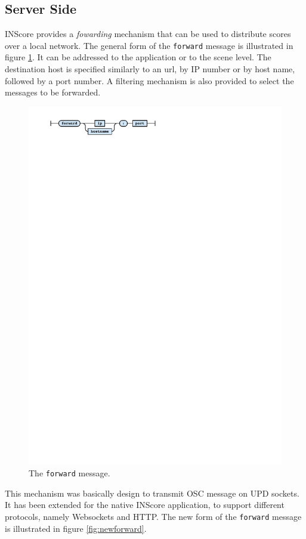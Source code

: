 \documentclass{article}
\newcommand{\icode}[1]	{{\small \texttt{#1}}}
\begin{document}
\subsection{Server Side}\label{sec:server}
INScore provides a \emph{fowarding} mechanism \cite{Fober:15b} that can be used to distribute scores over a local network.
The general form of the \icode{forward} message is illustrated in figure \ref{fig:forward}. It can be addressed to the application or to the scene level. The destination host is specified similarly to an url, by IP number or by host name, followed by a port number.
A filtering mechanism is also provided to select the messages to be forwarded.
\begin{figure}[h]
\centering
\includegraphics[width=0.7\columnwidth]{rsrc/faust3.pdf}
\caption{The \icode{forward} message.}
\label{fig:forward}
\end{figure}
This mechanism was basically design to transmit OSC message on UPD sockets.
It has been extended for the native INScore application, to support different protocols, namely Websockets and HTTP. The new form of the \icode{forward} message is illustrated in figure \ref{fig:newforward}.
\end{document}
